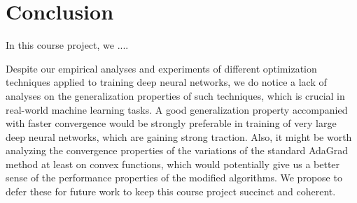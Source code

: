 \section{Conclusion}

In this course project, we ....

Despite our empirical analyses and experiments of different optimization techniques applied
to training deep neural networks, we do notice a lack of analyses on the generalization
properties of such techniques, which is crucial in real-world machine learning tasks. A good
generalization property accompanied with faster convergence would be strongly preferable
in training of very large deep neural networks, which are gaining strong traction. Also, it
might be worth analyzing the convergence properties of the variations of the standard
AdaGrad method at least on convex functions, which would potentially give us a better
sense of the performance properties of the modified algorithms. We propose to defer
these for future work to keep this course project succinct and coherent.